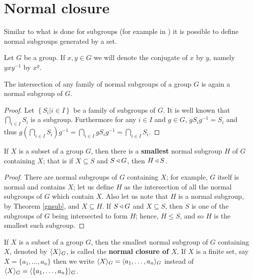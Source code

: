 \section{Normal closure}

Similar to what is done for subgroups (for example in \cite{RotmanITG}) it is possible to define normal subgroups generated by a set.

\begin{definition}
    Let $G$ be a group. If $x,y \in G$ we will denote the conjugate of $x$ by $y$, namely $yxy^{-1}$ by $x^{y}$.
\end{definition}

\begin{theorem}
    \label{gnsub}
    The intersection of any family of normal subgroups of a group $G$ is again a normal subgroup of $G$.
\end{theorem}

\begin{proof}
    Let $\left\{ S_i |i \in I \right\}$ be a family of subgroups of $G$. It is well known that $\bigcap_{i \in I} S_i$ is a subgroup. Furthermore for any $i \in I$ and $g \in G$, $gS_ig^{-1} = S_i$ and thus $g(\bigcap_{i \in I} S_i)g^{-1} = \bigcap_{i \in I} gS_ig^{-1} = \bigcap_{i \in I} S_i$.  
\end{proof}

\begin{theorem}
    If $X$ is a subset of a group $G$, then there is a \textbf{smallest} normal subgroup $H$ of $G$ containing $X$; that is if $X \subseteq S$ and $S \triangleleft G$, then $H \triangleleft S$.   
\end{theorem}

\begin{proof}
    There are normal subgroups of $G$ containing $X$; for example, $G$ itself is normal and contains $X$; let us define $H$ as the intersection of all the normal subgroups of $G$ which contain $X$. Also let us note that $H$ is a normal subgroup, by Theorem \ref{gnsub}, and $X \subseteq H$. If $S \triangleleft G$ and $X \subseteq S$, then $S$ is one of the subgroups of $G$ being intersected to form $H$; hence, $H \le S$, and so $H$ is the smallest such subgroup.
\end{proof}

\begin{definition}
    If $X$ is a subset of a group $G$, then the smallest normal subgroup of $G$ containing $X$, denoted by $\langle X \rangle_G$, is called the \textbf{normal closure of $X$}. If $X$ is a finite set, say $X = \{a_1, \ldots , a_n \}$ then we write $\langle X \rangle_G = \langle a_1, \ldots , a_n \rangle_G$ instead of $\langle X \rangle_G = \langle \left\{a_1, \ldots , a_n\right\} \rangle_G$.
\end{definition}

